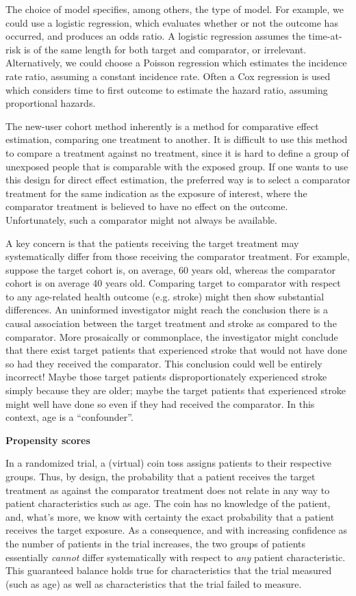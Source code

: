 \documentclass[]{book}
\let\BeginKnitrBlock\begin \let\EndKnitrBlock\end
\begin{document}
The choice of model specifies, among others, the type of model. For
example, we could use a logistic regression, which evaluates whether or
not the outcome has occurred, and produces an odds ratio. A logistic
regression assumes the time-at-risk is of the same length for both
target and comparator, or irrelevant. Alternatively, we could choose a
Poisson regression which estimates the incidence rate ratio, assuming a
constant incidence rate. Often a Cox regression is used which considers
time to first outcome to estimate the hazard ratio, assuming
proportional hazards.

\BeginKnitrBlock{rmdimportant}
The new-user cohort method inherently is a method for comparative effect
estimation, comparing one treatment to another. It is difficult to use
this method to compare a treatment against no treatment, since it is
hard to define a group of unexposed people that is comparable with the
exposed group. If one wants to use this design for direct effect
estimation, the preferred way is to select a comparator treatment for
the same indication as the exposure of interest, where the comparator
treatment is believed to have no effect on the outcome. Unfortunately,
such a comparator might not always be available.
\EndKnitrBlock{rmdimportant}

A key concern is that the patients receiving the target treatment may
systematically differ from those receiving the comparator treatment. For
example, suppose the target cohort is, on average, 60 years old, whereas
the comparator cohort is on average 40 years old. Comparing target to
comparator with respect to any age-related health outcome (e.g. stroke)
might then show substantial differences. An uninformed investigator
might reach the conclusion there is a causal association between the
target treatment and stroke as compared to the comparator. More
prosaically or commonplace, the investigator might conclude that there
exist target patients that experienced stroke that would not have done
so had they received the comparator. This conclusion could well be
entirely incorrect! Maybe those target patients disproportionately
experienced stroke simply because they are older; maybe the target
patients that experienced stroke might well have done so even if they
had received the comparator. In this context, age is a ``confounder''.

\textbf{Propensity scores}

In a randomized trial, a (virtual) coin toss assigns patients to their
respective groups. Thus, by design, the probability that a patient
receives the target treatment as against the comparator treatment does
not relate in any way to patient characteristics such as age. The coin
has no knowledge of the patient, and, what's more, we know with
certainty the exact probability that a patient receives the target
exposure. As a consequence, and with increasing confidence as the number
of patients in the trial increases, the two groups of patients
essentially \emph{cannot} differ systematically with respect to
\emph{any} patient characteristic. This guaranteed balance holds true
for characteristics that the trial measured (such as age) as well as
characteristics that the trial failed to measure.
\end{document}
